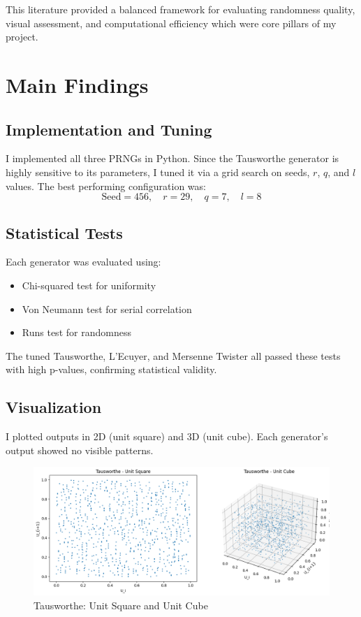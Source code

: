 \documentclass[twocolumn,12pt]{article}
\begin{document}
This literature provided a balanced framework for evaluating randomness quality, visual assessment, and computational efficiency which were core pillars of my project.

\section{Main Findings}

\subsection{Implementation and Tuning}
I implemented all three PRNGs in Python. Since the Tausworthe generator is highly sensitive to its parameters, I tuned it via a grid search on seeds, \(r\), \(q\), and \(l\) values. The best performing configuration was:
\[
\text{Seed}=456, \quad r=29, \quad q=7, \quad l=8
\]

\subsection{Statistical Tests}
Each generator was evaluated using:
\begin{itemize}
    \item Chi-squared test for uniformity
    \item Von Neumann test for serial correlation
    \item Runs test for randomness
\end{itemize}

The tuned Tausworthe, L’Ecuyer, and Mersenne Twister all passed these tests with high p-values, confirming statistical validity.

\subsection{Visualization}
I plotted outputs in 2D (unit square) and 3D (unit cube). Each generator's output showed no visible patterns.

\begin{figure}[H]
\centering
\includegraphics[width=0.9\linewidth]{tausworthe_vis.png}
\caption{Tausworthe: Unit Square and Unit Cube}
\end{figure}
\end{document}
